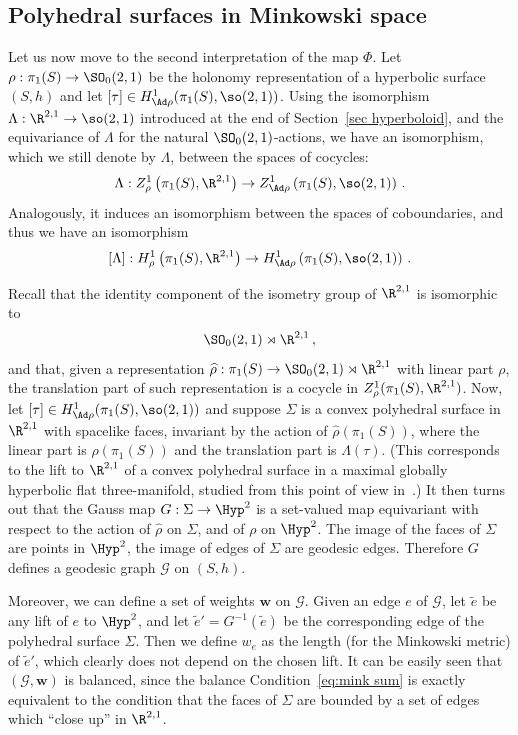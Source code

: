\subsection{Polyhedral surfaces in Minkowski space} Let us now move to the second interpretation of the map $\Phi$. Let $\rho:\pi_1(S)\to\SO_0(2,1)$ be the holonomy representation of a hyperbolic surface $(S,h)$ and let $[\tau]\in H^1_{\Ad\rho}(\pi_1(S),\so(2,1))$. Using the isomorphism $\Lambda:\R^{2,1}\to\so(2,1)$ introduced at the end of Section~\ref{sec hyperboloid}, and the equivariance of $\Lambda$ for the natural $\SO_0(2,1)$-actions, we have an isomorphism, which we still denote by $\Lambda$, between the spaces of cocycles:
\[
\Lambda:{Z}^1_{\rho}\left(\pi_1(S),\R^{2,1}\right)\to {Z}^1_{\Ad\rho}\left(\pi_1(S),\so(2,1)\right)\,.
\]
Analogously, it induces an isomorphism between the spaces of coboundaries, and thus we have an isomorphism
\[
[\Lambda]:H^1_{\rho}\left(\pi_1(S),\R^{2,1}\right)\to H^1_{\Ad\rho}\left(\pi_1(S),\so(2,1)\right)\,.
\]

Recall that the identity component of the isometry group of $\R^{2,1}$ is isomorphic to
\[
\SO_0(2,1)\rtimes\R^{2,1}\,,
\]
and that, given a representation $\widehat\rho:\pi_1(S)\to \SO_0(2,1)\rtimes\R^{2,1}$ with linear part $\rho$, the translation part of such representation is a cocycle in $Z^1_{\rho}(\pi_1(S),\R^{2,1})$. Now, let $[\tau]\in H^1_{\Ad\rho}(\pi_1(S),\so(2,1))$ and suppose $\Sigma$ is a convex polyhedral surface in $\R^{2,1}$ with spacelike faces, invariant by the action of $\widehat\rho(\pi_1(S))$, where the linear part is $\rho(\pi_1(S))$ and the translation part is $\Lambda(\tau)$. (This corresponds to the lift to $\R^{2,1}$ of a convex polyhedral surface in a maximal globally hyperbolic flat three-manifold, studied from this point of view in~\cite{mess}.) It then turns out that the Gauss map $G:\Sigma\to\Hyp^2$ is a set-valued map equivariant with respect to the action of $\widehat\rho$ on $\Sigma$, and of $\rho$ on $\Hyp^2$. The image of the faces of $\Sigma$ are points in $\Hyp^2$, the image of edges of $\Sigma$ are geodesic edges. Therefore $G$ defines a geodesic graph $\mathcal{G}$ on $(S,h)$.

Moreover, we can define a set of weights $\mathbf w$ on $\mathcal{G}$. Given an edge $e$ of $\mathcal{G}$, let $\widetilde e$ be any lift of $e$ to $\Hyp^2$, and let $\widetilde e'=G^{-1}(\widetilde e)$ be the corresponding edge of the polyhedral surface $\Sigma$. Then we define $w_e$ as the length (for the Minkowski metric) of $\widetilde e'$, which clearly does not depend on the chosen lift. It can be easily seen that $(\mathcal{G},\mathbf w)$ is balanced, since the balance Condition~\eqref{eq:mink sum} is exactly equivalent to the condition that the faces of $\Sigma$ are bounded by a set of edges which ``close up'' in $\R^{2,1}$.

